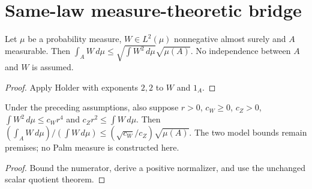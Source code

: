 \section{Same-law measure-theoretic bridge}
\begin{lemma}
\label{lem:event-cs}
Let $\mu$ be a probability measure, $W\in L^2(\mu)$ nonnegative almost
surely and $A$ measurable. Then
$\int_A W\,d\mu\le\sqrt{\int W^2\,d\mu}\sqrt{\mu(A)}$.
No independence between $A$ and $W$ is assumed.
\end{lemma}
\begin{proof}Apply Holder with exponents $2,2$ to $W$ and $1_A$.\end{proof}
\begin{lemma}
\label{lem:measure-transfer}
Under the preceding assumptions, also suppose $r>0$, $c_W\ge0$, $c_Z>0$,
$\int W^2\,d\mu\le c_Wr^4$ and $c_Zr^2\le\int W\,d\mu$.
Then $(\int_A W\,d\mu)/(\int W\,d\mu)\le(\sqrt{c_W}/c_Z)\sqrt{\mu(A)}$.
The two model bounds remain premises; no Palm measure is constructed here.
\end{lemma}
\begin{proof}Bound the numerator, derive a positive normalizer, and use
the unchanged scalar quotient theorem.\end{proof}
